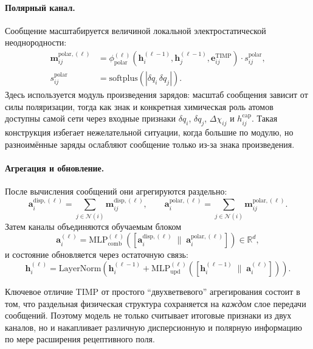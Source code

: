 \documentclass[11pt]{article}
\begin{document}
\paragraph{Полярный канал.}
Сообщение масштабируется величиной локальной электростатической неоднородности:
\begin{align*}
\mathbf{m}_{ij}^{\mathrm{polar},(\ell)} &= \phi_{\mathrm{polar}}^{(\ell)}\!\left(\mathbf{h}_i^{(\ell-1)},\mathbf{h}_j^{(\ell-1)},\mathbf{e}_{ij}^{\mathrm{TIMP}}\right) \cdot s_{ij}^{\mathrm{polar}}, \\
s_{ij}^{\mathrm{polar}} &= \mathrm{softplus}\!\left(|\delta q_i\,\delta q_j|\right).
\end{align*}
Здесь используется модуль произведения зарядов: масштаб сообщения зависит от силы поляризации, тогда как знак и конкретная химическая роль атомов доступны самой сети через входные признаки $\delta q_i$, $\delta q_j$, $\Delta\chi_{ij}$ и $h_{ij}^{\mathrm{cap}}$. Такая конструкция избегает нежелательной ситуации, когда большие по модулю, но разноимённые заряды ослабляют сообщение только из-за знака произведения.

\paragraph{Агрегация и обновление.}
После вычисления сообщений они агрегируются раздельно:
\begin{equation*}
\mathbf{a}_i^{\mathrm{disp},(\ell)} = \sum_{j\in\mathcal{N}(i)} \mathbf{m}_{ij}^{\mathrm{disp},(\ell)},
\qquad
\mathbf{a}_i^{\mathrm{polar},(\ell)} = \sum_{j\in\mathcal{N}(i)} \mathbf{m}_{ij}^{\mathrm{polar},(\ell)}.
\end{equation*}
Затем каналы объединяются обучаемым блоком
\begin{equation*}
\mathbf{a}_i^{(\ell)} = \mathrm{MLP}_{\mathrm{comb}}^{(\ell)}\!\left([\mathbf{a}_i^{\mathrm{disp},(\ell)} \;\|\; \mathbf{a}_i^{\mathrm{polar},(\ell)}]\right) \in \mathbb{R}^{d},
\end{equation*}
и состояние обновляется через остаточную связь:
\begin{equation*}
\mathbf{h}_i^{(\ell)} = \mathrm{LayerNorm}\!\left(\mathbf{h}_i^{(\ell-1)} + \mathrm{MLP}_{\mathrm{upd}}^{(\ell)}\!\left([\mathbf{h}_i^{(\ell-1)} \;\|\; \mathbf{a}_i^{(\ell)}]\right)\right).
\end{equation*}

Ключевое отличие TIMP от простого ``двухветвевого'' агрегирования состоит в том, что раздельная физическая структура сохраняется на \emph{каждом} слое передачи сообщений. Поэтому модель не только считывает итоговые признаки из двух каналов, но и накапливает различную дисперсионную и полярную информацию по мере расширения рецептивного поля.
\end{document}
